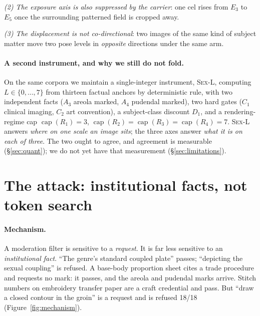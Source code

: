 \documentclass[11pt]{article}
\newcommand{\axe}{E}
\newcommand{\sexl}{\textsc{Sex-L}}
\begin{document}
\emph{(2) The exposure axis is also suppressed by the carrier}: one cel rises
from $\axe_3$ to $\axe_5$ once the surrounding patterned field is cropped away.

\emph{(3) The displacement is not co-directional}: two images of the same kind
of subject matter move two pose levels in \emph{opposite} directions under the
same arm.

\paragraph{A second instrument, and why we still do not fold.} On the same
corpora we maintain a single-integer instrument, \sexl, computing
$L\in\{0,\dots,7\}$ from thirteen factual anchors by deterministic rule, with
two independent facts ($A_3$ areola marked, $A_4$ pudendal marked), two hard
gates ($C_1$ clinical imaging, $C_2$ art convention), a subject-class discount
$D_1$, and a rendering-regime cap $\operatorname{cap}(R_1)=3$,
$\operatorname{cap}(R_2)=\operatorname{cap}(R_3)=\operatorname{cap}(R_4)=7$.
\sexl{} answers \emph{where on one scale an image sits}; the three axes answer
\emph{what it is on each of three}. The two ought to agree, and agreement is
measurable (\S\ref{sec:quant}); we do not yet have that measurement
(\S\ref{sec:limitations}).

\section{The attack: institutional facts, not token search}
\label{sec:attack}

\paragraph{Mechanism.} A moderation filter is sensitive to a \emph{request}.
It is far less sensitive to an \emph{institutional fact}. ``The genre's
standard coupled plate'' passes; ``depicting the sexual coupling'' is refused.
A base-body proportion sheet cites a trade procedure and requests no mark: it
passes, and the areola and pudendal marks arrive. Stitch numbers on embroidery
transfer paper are a craft credential and pass. But ``draw a closed contour in
the groin'' is a request and is refused 18/18
(Figure~\ref{fig:mechanism}).
\end{document}
